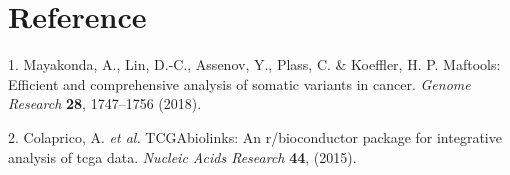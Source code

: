\documentclass[
]{article}
\newenvironment{cslreferences}%
  {}%
  {\par}
\begin{document}
\hypertarget{bibliography}{%
\section*{Reference}\label{bibliography}}

\hypertarget{refs}{}
\begin{cslreferences}
\leavevmode\hypertarget{ref-MaftoolsEfficMayako2018}{}%
1. Mayakonda, A., Lin, D.-C., Assenov, Y., Plass, C. \& Koeffler, H. P. Maftools: Efficient and comprehensive analysis of somatic variants in cancer. \emph{Genome Research} \textbf{28}, 1747--1756 (2018).

\leavevmode\hypertarget{ref-TcgabiolinksAColapr2015}{}%
2. Colaprico, A. \emph{et al.} TCGAbiolinks: An r/bioconductor package for integrative analysis of tcga data. \emph{Nucleic Acids Research} \textbf{44}, (2015).
\end{cslreferences}
\end{document}

